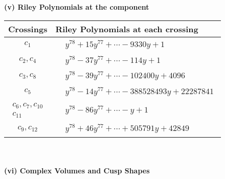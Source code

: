 \documentclass[1p]{elsarticle_modified}
\theoremstyle{definition}
\begin{document}
\newpage\renewcommand{\arraystretch}{1}
\flushleft \textbf{(v) Riley Polynomials at the component}\newline \\
\begin{tabular}{m{50pt}|m{274pt}}
Crossings & \hspace{64pt}Riley Polynomials at each crossing \\
\hline $$\begin{aligned}c_{1}\end{aligned}$$&$\begin{aligned}
&y^{78}+15 y^{77}+\cdots-9330 y+1
\end{aligned}$\\
\hline $$\begin{aligned}c_{2},c_{4}\end{aligned}$$&$\begin{aligned}
&y^{78}-37 y^{77}+\cdots-114 y+1
\end{aligned}$\\
\hline $$\begin{aligned}c_{3},c_{8}\end{aligned}$$&$\begin{aligned}
&y^{78}-39 y^{77}+\cdots-102400 y+4096
\end{aligned}$\\
\hline $$\begin{aligned}c_{5}\end{aligned}$$&$\begin{aligned}
&y^{78}-14 y^{77}+\cdots-388528493 y+22287841
\end{aligned}$\\
\hline $$\begin{aligned}c_{6},c_{7},c_{10}\\c_{11}\end{aligned}$$&$\begin{aligned}
&y^{78}-86 y^{77}+\cdots- y+1
\end{aligned}$\\
\hline $$\begin{aligned}c_{9},c_{12}\end{aligned}$$&$\begin{aligned}
&y^{78}+46 y^{77}+\cdots+505791 y+42849
\end{aligned}$\\
\hline
\end{tabular}\\~\\
\newpage\flushleft \textbf{(vi) Complex Volumes and Cusp Shapes}
\end{document}
